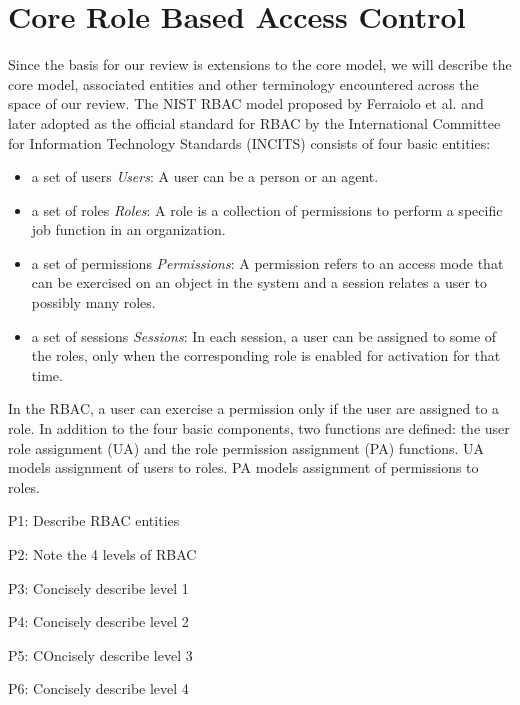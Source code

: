 \section{Core Role Based Access Control} \label{sec:core-rbac}

Since the basis for our review is extensions to the core model, we will describe the core model, associated entities and other terminology encountered across the space of our review.  The NIST RBAC model proposed by Ferraiolo et al. and later adopted as the official standard for RBAC by the International Committee for Information Technology Standards (INCITS) consists of four basic entities:

\begin{itemize}
\item a set of users \emph{Users}: A user can be a person or an agent.
\item  a set of roles \emph{Roles}: A role is a collection of permissions to perform a specific job function in an organization.
\item a set of permissions \emph{Permissions}: A permission refers to an access mode that can be exercised on an object in the system and a session relates a user to possibly many roles.
\item a set of sessions \emph{Sessions}: In each session, a user can be assigned to some of the roles, only when the corresponding role is enabled for activation for that time.		
\end{itemize}

In the RBAC, a user can exercise a permission only if the user are assigned to a role.
In addition to the four basic components, two functions are defined:
the user role assignment (UA) and the role
permission assignment (PA) functions.
UA models assignment of users to roles.
PA models assignment of permissions to roles.


P1: Describe RBAC entities

P2: Note the 4 levels of RBAC

P3: Concisely describe level 1

P4: Concisely describe level 2

P5: COncisely describe level 3

P6: Concisely describe level 4

